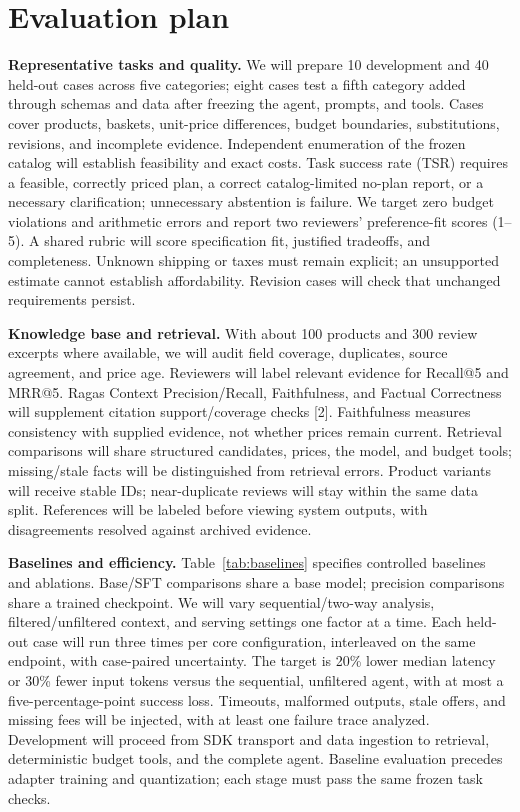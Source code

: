 \documentclass[11pt,letterpaper]{article}
\begin{document}
\section{Evaluation plan}
\textbf{Representative tasks and quality.} We will prepare 10 development and 40 held-out cases across five categories; eight cases test a fifth category added through schemas and data after freezing the agent, prompts, and tools. Cases cover products, baskets, unit-price differences, budget boundaries, substitutions, revisions, and incomplete evidence. Independent enumeration of the frozen catalog will establish feasibility and exact costs. Task success rate (TSR) requires a feasible, correctly priced plan, a correct catalog-limited no-plan report, or a necessary clarification; unnecessary abstention is failure. We target zero budget violations and arithmetic errors and report two reviewers' preference-fit scores (1--5). A shared rubric will score specification fit, justified tradeoffs, and completeness. Unknown shipping or taxes must remain explicit; an unsupported estimate cannot establish affordability. Revision cases will check that unchanged requirements persist.

\textbf{Knowledge base and retrieval.} With about 100 products and 300 review excerpts where available, we will audit field coverage, duplicates, source agreement, and price age. Reviewers will label relevant evidence for Recall@5 and MRR@5. Ragas Context Precision/Recall, Faithfulness, and Factual Correctness will supplement citation support/coverage checks [2]. Faithfulness measures consistency with supplied evidence, not whether prices remain current. Retrieval comparisons will share structured candidates, prices, the model, and budget tools; missing/stale facts will be distinguished from retrieval errors. Product variants will receive stable IDs; near-duplicate reviews will stay within the same data split. References will be labeled before viewing system outputs, with disagreements resolved against archived evidence.

\textbf{Baselines and efficiency.} Table~\ref{tab:baselines} specifies controlled baselines and ablations. Base/SFT comparisons share a base model; precision comparisons share a trained checkpoint. We will vary sequential/two-way analysis, filtered/unfiltered context, and serving settings one factor at a time. Each held-out case will run three times per core configuration, interleaved on the same endpoint, with case-paired uncertainty. The target is 20\% lower median latency or 30\% fewer input tokens versus the sequential, unfiltered agent, with at most a five-percentage-point success loss. Timeouts, malformed outputs, stale offers, and missing fees will be injected, with at least one failure trace analyzed. Development will proceed from SDK transport and data ingestion to retrieval, deterministic budget tools, and the complete agent. Baseline evaluation precedes adapter training and quantization; each stage must pass the same frozen task checks.
\end{document}

